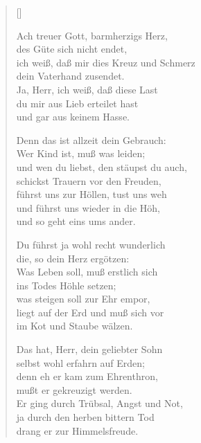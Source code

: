 \begin{multicols}{2}
\settowidth{\versewidth}{Denn das ist allzeit dein Gebrauch:}
\begin{verse}[\versewidth]

 Ach treuer Gott, barmherzigs Herz,\\
des Güte sich nicht endet,\\
ich weiß, daß mir dies Kreuz und Schmerz\\
dein Vaterhand zusendet.\\
Ja, Herr, ich weiß, daß diese Last\\
du mir aus Lieb erteilet hast\\
und gar aus keinem Hasse.

 Denn das ist allzeit dein Gebrauch:\\
Wer Kind ist, muß was leiden;\\
und wen du liebst, den stäupst du auch,\\
schickst Trauern vor den Freuden,\\
führst uns zur Höllen, tust uns weh\\
und führst uns wieder in die Höh,\\
und so geht eins ums ander.

 Du führst ja wohl recht wunderlich\\
die, so dein Herz ergötzen:\\
Was Leben soll, muß erstlich sich\\
ins Todes Höhle setzen;\\
was steigen soll zur Ehr empor,\\
liegt auf der Erd und muß sich vor\\
im Kot und Staube wälzen.

 Das hat, Herr, dein geliebter Sohn\\
selbst wohl erfahrn auf Erden;\\
denn eh er kam zum Ehrenthron,\\
mußt er gekreuzigt werden.\\
Er ging durch Trübsal, Angst und Not,\\
ja durch den herben bittern Tod\\
drang er zur Himmelsfreude.


\end{verse}
\end{multicols}
